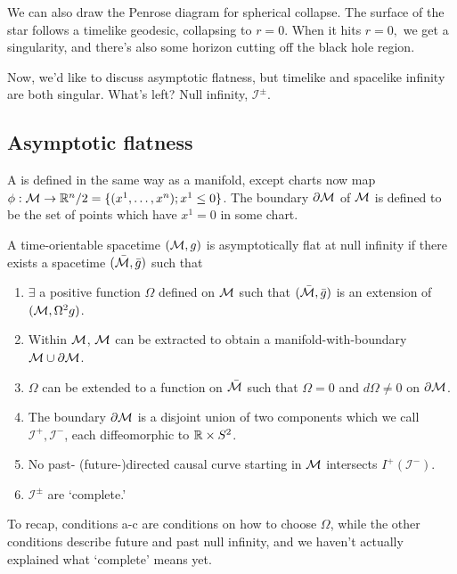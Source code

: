 We can also draw the Penrose diagram for spherical collapse. The surface of the star follows a timelike geodesic, collapsing to $r=0$. When it hits $r=0,$ we get a singularity, and there's also some horizon cutting off the black hole region.

Now, we'd like to discuss asymptotic flatness, but timelike and spacelike infinity are both singular. What's left? Null infinity, $\mathcal{I}^\pm$.

\subsection*{Asymptotic flatness}
\begin{defn}
    A  is defined in the same way as a manifold, except charts now map $\phi:\mathcal{M} \to \mathbb{R}^n/2 = \{(x^1,\ldots ,x^n); x^1 \leq 0\}$.
    The boundary $\partial \mathcal{M}$ of $\mathcal{M}$ is defined to be the set of points which have $x^1=0$ in some chart.
\end{defn}
\begin{defn}
    A time-orientable spacetime $(\mathcal{M},g)$ is asymptotically flat at null infinity if there exists a spacetime $(\bar {\mathcal{M}},\bar g)$ such that
    \begin{enumerate}
        \item $\exists$ a positive function $\Omega$ defined on $\mathcal{M}$ such that $(\bar {\mathcal{M}},\bar g)$ is an extension of $(\mathcal{M},\Omega^2 g)$.
        \item Within $\mathcal{M}$, $\mathcal{M}$ can be extracted to obtain a manifold-with-boundary $\mathcal{M} \cup \partial \mathcal{M}$.
        \item $\Omega$ can be extended to a function on $\bar {\mathcal{M}}$ such that $\Omega=0$ and $d\Omega \neq 0$ on $\partial\mathcal{M}$.
        \item The boundary $\partial \mathcal{M}$ is a disjoint union of two components which we call $\mathcal{I}^+, \mathcal{I}^-$, each diffeomorphic to $\mathbb{R}\times S^2$.
        \item No past- (future-)directed causal curve starting in $\mathcal{M}$ intersects $I^+(\mathcal{I}^-)$.
        \item $\mathcal{I}^\pm$ are `complete.'
    \end{enumerate}
\end{defn}
To recap, conditions a-c are conditions on how to choose $\Omega$, while the other conditions describe future and past null infinity, and we haven't actually explained what `complete' means yet.

